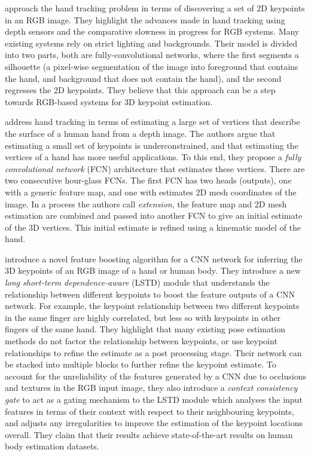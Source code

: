 \cite{wang2018mask} approach the hand tracking problem in terms of discovering a set of 2D keypoints in an RGB image. They highlight the advances made in hand tracking using depth sensors and the comparative slowness in progress for RGB systems. Many existing systems rely on strict lighting and backgrounds. Their model is divided into two parts, both are fully-convolutional networks, where the first segments a silhouette (a pixel-wise segmentation of the image into foreground that contains the hand, and background that does not contain the hand), and the second regresses the 2D keypoints. They believe that this approach can be a step towards RGB-based systems for 3D keypoint estimation.

\cite{wan2019dual} address hand tracking in terms of estimating a large set of vertices that describe the surface of a human hand from a depth image. The authors argue that estimating a small set of keypoints is underconstrained, and that estimating the vertices of a hand has more useful applications. To this end, they propose a {\slshape fully convolutional network} (FCN) architecture that estimates these vertices. There are two consecutive hour-glass FCNs. The first FCN has two heads (outputs), one with a generic feature map, and one with estimates 2D mesh coordinates of the image. In a process the authors call {\slshape extension}, the feature map and 2D mesh estimation are combined and passed into another FCN to give an initial estimate of the 3D vertices. This initial estimate is refined using a kinematic model of the hand.

\cite{liu2019feature} introduce a novel feature boosting algorithm for a CNN network for inferring the 3D keypoints of an RGB image of a hand or human body. They introduce a new {\slshape long short-term dependence-aware} (LSTD) module that understands the relationship between different keypoints to boost the feature outputs of a CNN network. For example, the keypoint relationship between two different keypoints in the same finger are highly correlated, but less so with keypoints in other fingers of the same hand. They highlight that many existing pose estimation methods do not factor the relationship between keypoints, or use keypoint relationships to refine the estimate as a post processing stage. Their network can be stacked into multiple blocks to further refine the keypoint estimate. To account for the unreliability of the features generated by a CNN due to occlusions and textures in the RGB input image, they also introduce a {\slshape context consistency gate} to act as a gating mechanism to the LSTD module which analyses the input features in terms of their context with respect to their neighbouring keypoints, and adjusts any irregularities to improve the estimation of the keypoint locations overall. They claim that their results achieve state-of-the-art results on human body estimation datasets.

